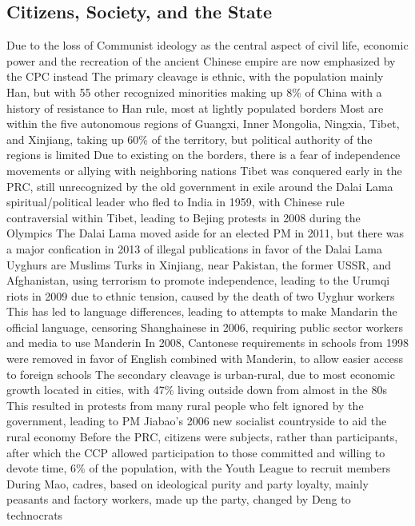 \documentclass[11 pt, twoside]{article}
\newenvironment{outline*}
{
	\begin{outline}[enumerate]
	}
	{\end{outline}
}
\begin{document}
\subsection{Citizens, Society, and the State}
\begin{outline*}
\1 Due to the loss of Communist ideology as the central aspect of civil life, economic power and the recreation of the ancient Chinese empire are now emphasized by the CPC instead
\1 The primary cleavage is ethnic, with the population mainly Han, but with 55 other recognized minorities making up 8\% of China with a history of resistance to Han rule, most at lightly populated borders
\2 Most are within the five autonomous regions of Guangxi, Inner Mongolia, Ningxia, Tibet, and Xinjiang, taking up 60\% of the territory, but political authority of the regions is limited
\2 Due to existing on the borders, there is a fear of independence movements or allying with neighboring nations
\2 Tibet was conquered early in the PRC, still unrecognized by the old government in exile around the Dalai Lama spiritual/political leader who fled to India in 1959, with Chinese rule contraversial within Tibet, leading to Bejing protests in 2008 during the Olympics
\3 The Dalai Lama moved aside for an elected PM in 2011, but there was a major confication in 2013 of illegal publications in favor of the Dalai Lama
\2 Uyghurs are Muslims Turks in Xinjiang, near Pakistan, the former USSR, and Afghanistan, using terrorism to promote independence, leading to the Urumqi riots in 2009 due to ethnic tension, caused by the death of two Uyghur workers
\2 This has led to language differences, leading to attempts to make Mandarin the official language, censoring Shanghainese in 2006, requiring public sector workers and media to use Manderin
\3 In 2008, Cantonese requirements in schools from 1998 were removed in favor of English combined with Manderin, to allow easier access to foreign schools
\1 The secondary cleavage is urban-rural, due to most economic growth located in cities, with 47\% living outside down from almost in the 80s
\2 This resulted in protests from many rural people who felt ignored by the government, leading to PM Jiabao's 2006 new socialist countryside to aid the rural economy
\1 Before the PRC, citizens were subjects, rather than participants, after which the CCP allowed participation to those committed and willing to devote time, 6\% of the population, with the Youth League to recruit members
\2 During Mao, cadres, based on ideological purity and party loyalty, mainly peasants and factory workers, made up the party, changed by Deng to technocrats

\end{outline*}
\end{document}
